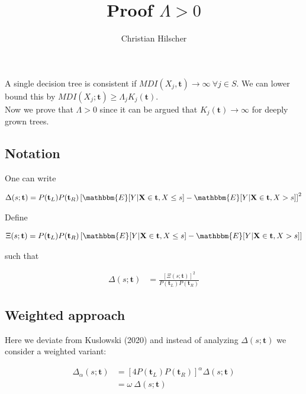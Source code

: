 \documentclass{article}
\title{Proof $\Lambda > 0$}
\author{Christian Hilscher}
\begin{document}
\maketitle


A single decision tree is consistent if $MDI(X_j, \mathbf{t}) \rightarrow \infty \ \forall j \in S$. We can lower bound this by $MDI(X_j; \mathbf{t}) \geq \Lambda_j K_j(\mathbf{t})$. \\

Now we prove that $\Lambda > 0$ since it can be argued that $K_j(\mathbf{t}) \rightarrow \infty$ for deeply grown trees.

\subsection*{Notation}
One can write

\begin{align*}
    \Delta(s; \mathbf{t}) = P(\mathbf{t}_L) P(\mathbf{t}_R) \left [\mathbbm{E}[Y | \mathbf{X} \in \mathbf{t}, X \leq s] - \mathbbm{E}[Y | \mathbf{X} \in \mathbf{t}, X > s] \right ]^2
\end{align*}

Define

\begin{align}
    \Xi(s; \mathbf{t}) = P(\mathbf{t}_L) P(\mathbf{t}_R) \left [\mathbbm{E}[Y | \mathbf{X} \in \mathbf{t}, X \leq s] - \mathbbm{E}[Y | \mathbf{X} \in \mathbf{t}, X > s] \right ] \label{Xi}
\end{align}

such that 

\begin{align*}
    \Delta(s; \mathbf{t}) &= \frac{[\Xi(s; \mathbf{t})]^2}{P(\mathbf{t}_L) P(\mathbf{t}_R)}
\end{align*}

\subsection*{Weighted approach}

Here we deviate from Kuslowski (2020) and instead of analyzing $\Delta(s; \mathbf{t})$ we consider a weighted variant:

\begin{align}
    \Delta_{\alpha}(s; \mathbf{t}) &= [4 P(\mathbf{t}_L) P(\mathbf{t}_R)]^{\alpha} \Delta (s; \mathbf{t}) \label{delta_alpha} \\
    &= \omega \ \Delta (s; \mathbf{t}) \nonumber
\end{align}
\end{document}
